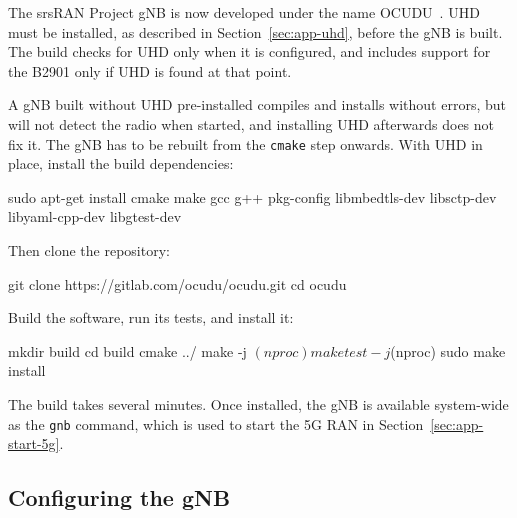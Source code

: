 The srsRAN Project \gls{gNB} is now developed under the name OCUDU~\cite{ocudu_project}.
UHD must be installed, as described in Section~\ref{sec:app-uhd}, before the \gls{gNB} is built. The build checks for UHD only when it is configured, and includes support for the B2901 only if UHD is found at that point.

A \gls{gNB} built without UHD pre-installed compiles and installs without errors, but will not detect the radio when started, and installing UHD afterwards does not fix it. The \gls{gNB} has to be rebuilt from the \texttt{cmake} step onwards. With UHD in place, install the build dependencies:

\begin{code}
sudo apt-get install cmake make gcc g++ pkg-config libmbedtls-dev libsctp-dev libyaml-cpp-dev libgtest-dev
\end{code}

Then clone the repository:

\begin{code}
git clone https://gitlab.com/ocudu/ocudu.git
cd ocudu
\end{code}

Build the software, run its tests, and install it:
\begin{code}
mkdir build
cd build
cmake ../
make -j $(nproc)
make test -j $(nproc)
sudo make install
\end{code}

The build takes several minutes. Once installed, the \gls{gNB} is available system-wide as the \texttt{gnb} command, which is used to start the 5G \gls{RAN} in Section~\ref{sec:app-start-5g}.

\subsection{Configuring the gNB}
\label{sec:app-gnb-config}

